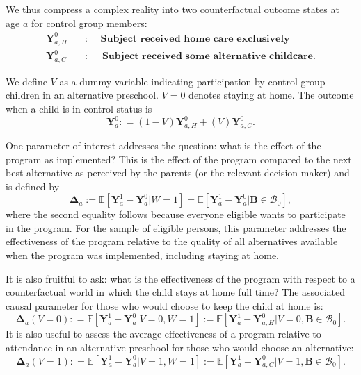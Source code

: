 We thus compress a complex reality into two counterfactual outcome states at age $a$ for control group members:
\begin{align*}
\bm{Y}_{a,H}^0 \quad &: \quad \textbf{ Subject received home care exclusively} \\
\bm{Y}_{a,C}^0 \quad &: \quad \textbf{ Subject received some alternative childcare}.
\end{align*}

We define $V$ as a dummy variable indicating participation by control-group children in an alternative preschool. $V=0$ denotes staying at home. The outcome when a child is in control status is
\begin{equation}
\bm{Y}^0_a : = \left( 1 - V \right) \bm{Y}^0_{a,H} + \left( V \right) \bm{Y}^0_{a,C}. \label{eq:meandiff}
\end{equation}

One parameter of interest addresses the question: what is the effect of the program as implemented? This is the effect of the program compared to the next best alternative as perceived by the parents (or the relevant decision maker) and is defined by
\begin{equation}\label{eq:effect}
\bm{\Delta}_a := \mathbb{E} \left[ \bm{Y}^1_a -  \bm{Y}^0_a | W =1 \right] = \mathbb{E} \left[\bm{Y}^1_a - \bm{Y}^0_a | \bm{B} \in \mathcal{B}_0 \right],
\end{equation}
where the second equality follows because everyone eligible wants to participate in the program. For the sample of eligible persons, this parameter addresses the effectiveness of the program relative to the quality of all alternatives available when the program was implemented, including staying at home.

It is also fruitful to ask: what is the effectiveness of the program with respect to a counterfactual world in which the child stays at home full time? The associated causal parameter for those who would choose to keep the child at home is:
\begin{equation}\label{eq:influenza}
\bm{\Delta}_a \left(V = 0 \right) : =   \mathbb{E} \left[ \bm{Y}^1_a - \bm{Y}^0_a | V = 0, W = 1 \right] := \mathbb{E} \left[\bm{Y}^1_{a} - \bm{Y}^0_{a,H} | V = 0, \bm{B} \in \mathcal{B}_0 \right].
\end{equation}
It is also useful to assess the average effectiveness of a program relative to attendance in an alternative preschool for those who would choose an alternative:
\begin{equation}\label{eq:smallpox}
\bm{\Delta}_a \left( V =1 \right) : =   \mathbb{E} \left[ \bm{Y}^1_a - \bm{Y}^0_a | V = 1, W = 1 \right] := \mathbb{E} \left[\bm{Y}^1_a - \bm{Y}^0_{a,C} | V = 1, \bm{B} \in \mathcal{B}_0 \right].
\end{equation}


